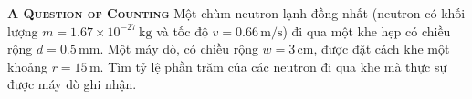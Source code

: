 
\begin{problem}
	{\textbf{\textsc{A Question of Counting}}} Một chùm neutron lạnh đồng nhất (neutron có khối lượng \( m = 1.67 \times 10^{-27} \, \text{kg} \) và tốc độ \( v = 0.66 \, \text{m/s} \)) đi qua một khe hẹp có chiều rộng \( d = 0.5 \, \text{mm} \). Một máy dò, có chiều rộng \( w = 3 \, \text{cm} \), được đặt cách khe một khoảng \( r = 15 \, \text{m} \). Tìm tỷ lệ phần trăm của các neutron đi qua khe mà thực sự được máy dò ghi nhận.
\end{problem}